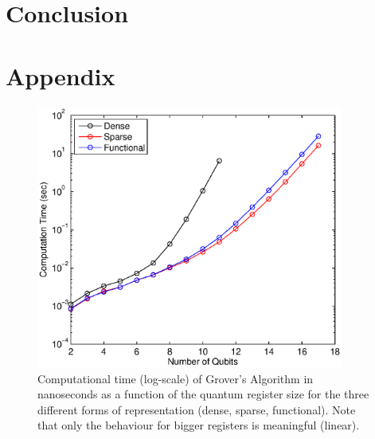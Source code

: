 \documentclass[bibliography=totocnumbered]{article}
\theoremstyle{NoticeStyle}
\begin{document}
%
\section{Conclusion}


%
\section{Appendix}

\begin{figure}[H]
	\centering
	\includegraphics[width=0.9\textwidth]{img/Grover_Time_Performance_log.eps}
	\caption{Computational time (log-scale) of Grover's Algorithm in nanoseconds as a function of the quantum register size for the three different forms of representation (dense, sparse, functional). Note that only the behaviour for bigger registers is meaningful (linear).}
	\label{grover_time_performance_log}
\end{figure}
%

\newpage

{}

\nocite{Perry2012}
\nocite{BasicConceptsQC}

\label{sec:References}


\end{document}
